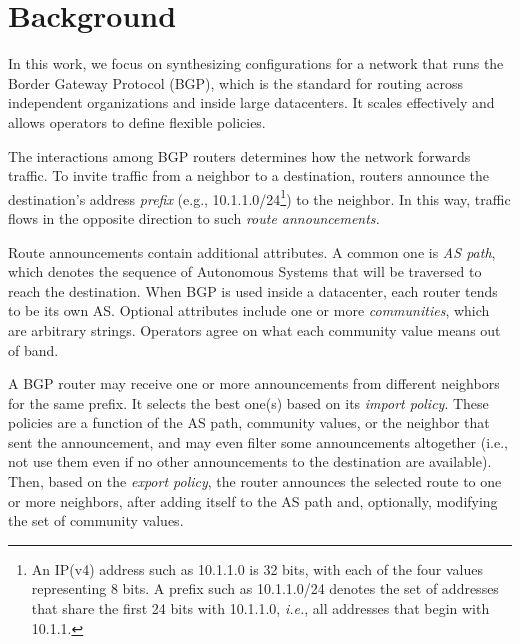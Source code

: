 \documentclass[numbers, 10pt, preprint]{sigplanconf}
\newcommand{\IE}{\emph{i.e.}}
\begin{document}

%
%
%
%

\section{Background}
\label{sec:background}

In this work, we focus on synthesizing configurations for a network that runs the Border Gateway Protocol (BGP), which is the standard for routing across independent organizations and inside large datacenters. It scales effectively and allows operators to define flexible policies.

The interactions among BGP routers determines how the network forwards traffic. To invite traffic from a neighbor to a destination, routers announce the destination's address {\em prefix} (e.g., 10.1.1.0/24\footnote{An IP(v4) address
such as 10.1.1.0 is 32 bits, with each of the four values representing 8 bits. A prefix such as 10.1.1.0/24 denotes the set of addresses that share the first 24 bits with 10.1.1.0, \IE, all addresses that begin with 10.1.1.}) to the neighbor. In this way, traffic flows in the opposite direction to such {\em route announcements.}

Route announcements contain additional attributes. A common one is {\em AS path}, which denotes the sequence of Autonomous Systems that will be traversed to reach the destination. When BGP is used inside a datacenter, each router tends to be its own AS. Optional attributes include one or more {\em communities}, which are arbitrary strings. Operators agree on what each community value means out of band.

A BGP router may receive one or more announcements from different neighbors for the same prefix. It selects the best one(s) based on its {\em import policy}. These policies are a function of the AS path, community values, or the neighbor that sent the announcement, and may even filter some announcements altogether (i.e., not use them even if no other announcements to the destination are available). Then, based on the {\em export policy}, the router announces the selected route to one or more neighbors, after adding itself to the AS path and, optionally, modifying the set of community values.
\end{document}
